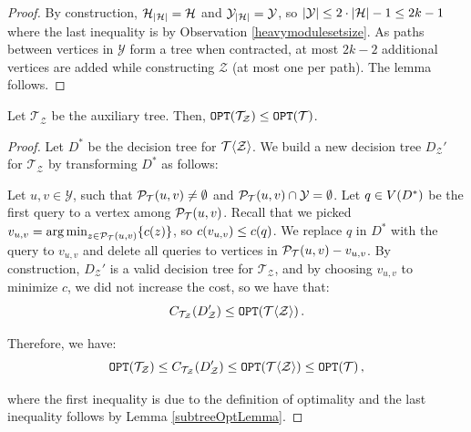 \begin{lemma}
\begin{proof}
        By construction, $\mathcal{H}_{\mathopen{}\left| \mathcal{H} \right|}=\mathcal{H}$ and $\mathcal{Y}_{\mathopen{}\left| \mathcal{H} \right|}=\mathcal{Y}$, so $\mathopen{}\left| \mathcal{Y} \right| \leq 2\cdot \mathopen{}\left| \mathcal{H} \right| - 1 \leq 2k-1$ where the last inequality is by Observation \ref{heavymodulesetsize}. As paths between vertices in $\mathcal{Y}$ form a tree when contracted, at most $2k-2$ additional vertices are added while constructing $\mathcal{Z}$ (at most one per path). The lemma follows.
    \end{proof}
\end{lemma}


\begin{lemma}\label{auxTreeCostLemma}
    Let $\mathcal{T}_{\mathcal{Z}}$ be the auxiliary tree. Then, $\texttt{OPT}\mathopen{}\left( \mathcal{T}_{\mathcal{Z}} \right)\leq \texttt{OPT}\mathopen{}\left( \mathcal{T} \right)$.
    \begin{proof}
        Let $D^*$ be the decision tree for $\mathcal{T}\mathopen{}\langle \mathcal{Z} \rangle$. We build a new decision tree $D_{\mathcal{Z}}'$ for $\mathcal{T}_{\mathcal{Z}}$ by transforming $D^*$ as follows: 
        
        Let $u,v\in \mathcal{Y}$, such that $\mathcal{P}_{\mathcal{T}}\mathopen{}\left( u, v \right)\neq\emptyset$ and $\mathcal{P}_{\mathcal{T}}\mathopen{}\left( u, v \right)\cap \mathcal{Y}=\emptyset$. Let $q\in V\mathopen{}\left( D^* \right)$ be the first query to a vertex among $\mathcal{P}_{\mathcal{T}}\mathopen{}\left( u, v \right)$. Recall that we picked $v_{u,v}=\operatorname*{arg\,min}_{z\in \mathcal{P}_{\mathcal{T}}\mathopen{}\left( u, v \right)}\mathopen{}\left\{ c\mathopen{}\left( z \right) \right\}$, so $c\mathopen{}\left( v_{u,v} \right)\leq c\mathopen{}\left( q \right)$. 
        We replace $q$ in $D^*$ with the query to $v_{u,v}$ and delete all queries to vertices in $\mathcal{P}_{\mathcal{T}}\mathopen{}\left( u, v \right)-v_{u,v}$. By construction, $D_{\mathcal{Z}}'$ is a valid decision tree for $\mathcal{T}_{\mathcal{Z}}$, and by choosing $v_{u,v}$ to minimize $c$, we did not increase the cost, so we have that: 
        $$
        C_{\mathcal{T}_{\mathcal{Z}}}\mathopen{}\left( D_{\mathcal{Z}}' \right) \leq \texttt{OPT}\mathopen{}\left( \mathcal{T}\mathopen{}\langle \mathcal{Z} \rangle \right).
        $$
        
        Therefore, we have:
        $$
        \texttt{OPT}\mathopen{}\left( \mathcal{T}_{\mathcal{Z}} \right)\leq C_{\mathcal{T}_{\mathcal{Z}}}\mathopen{}\left( D_{\mathcal{Z}}' \right)\leq \texttt{OPT}\mathopen{}\left( \mathcal{T}\mathopen{}\langle \mathcal{Z} \rangle \right)\leq \texttt{OPT}\mathopen{}\left( \mathcal{T} \right),
        $$
        
        where the first inequality is due to the definition of optimality and the last inequality follows by Lemma \ref{subtreeOptLemma}.
    \end{proof}
\end{lemma}

